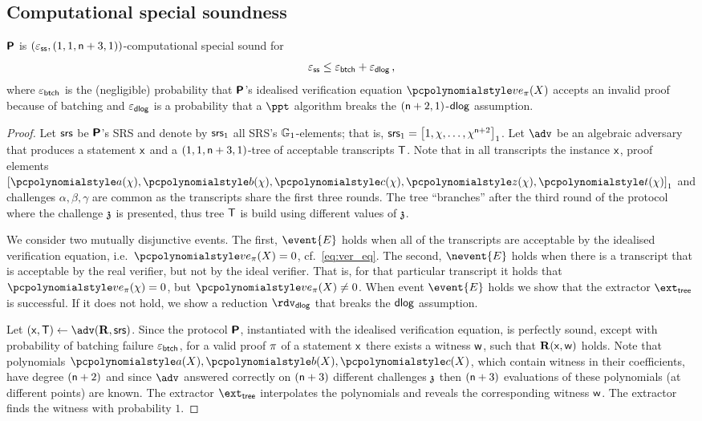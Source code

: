 \documentclass[runningheads,11pt]{llncs}
\begin{document}
\subsection{Computational special soundness}
\begin{lemma}
\label{lem:plonkprot_ss}
$\bm{\mathsf{P}}$ is $(\varepsilon_{\mathsf{ss}}, (1, 1, \mathsf{n} + 3, 1))$-computational special sound
for 
 \[
	\varepsilon_{\mathsf{ss}} \leq \varepsilon_{\mathsf{btch}} + \varepsilon_{\mathsf{dlog}}\,,
 \] 
 where $\varepsilon_{\mathsf{btch}}$ is the (negligible) probability that $\bm{\mathsf{P}}$'s idealised
 verification equation $\vereq_\zkproof(X)$ accepts an invalid proof because of batching
 and $\varepsilon_{\mathsf{dlog}}$ is a probability that a $\ppt$ algorithm breaks the
 $(\mathsf{n} + 2, 1)$-$\mathsf{dlog}$ assumption.
\end{lemma}
\begin{proof}
  Let $\mathsf{srs}$ be $\bm{\mathsf{P}}$'s SRS and denote by $\mathsf{srs}_1$ all SRS's
  $\mathbb{G}_1$-elements; that is,
  $\mathsf{srs}_1 = \left[1, \chi, \ldots, \chi^{\mathsf{n} + 2}\right]_{1}$. Let $\adv$ be an
  algebraic adversary that produces a statement $\mathsf{x}$ and a
  $(1, 1, \mathsf{n} + 3, 1)$-tree of acceptable transcripts $\mathsf{T}$.  Note that in
  all transcripts the instance $\mathsf{x}$, proof elements
  $\gone{\p{a}(\chi), \p{b}(\chi), \p{c}(\chi), \p{z}(\chi), \p{t}(\chi)}$ and
  challenges $\alpha, \beta, \gamma$ are common as the transcripts share the
  first three rounds. The tree ``branches'' after the third round of the protocol
  where the challenge $\mathfrak{z}$ is presented, thus tree $\mathsf{T}$ is build using different
  values of $\mathfrak{z}$. 

  We consider two mutually disjunctive events. The first, $\event{E}$ holds when
  all of the transcripts are acceptable by the idealised verification equation,
  i.e.~$\vereq_\zkproof(X) = 0$, cf.~\cref{eq:ver_eq}. The second, $\nevent{E}$ holds
  when there is a transcript that is acceptable by the real verifier, but not by
  the ideal verifier. That is, for that particular transcript it holds that
  $\vereq_\zkproof(\chi) = 0$, but $\vereq_\zkproof(X) \neq 0$.  When event $\event{E}$ holds we show that the extractor $\extt$ is successful. If it does not hold, we show a reduction
  $\rdvdlog$ that breaks the $\mathsf{dlog}$ assumption.

   Let $(\inp, \tree) \gets \adv(\REL,
  \srs)$. Since the protocol $\bm{\mathsf{P}}$, instantiated with the idealised
  verification equation, is perfectly sound, except with probability of batching
  failure $\varepsilon_{\mathsf{btch}}$, for a valid proof $\pi$ of a statement $\mathsf{x}$ there
  exists a witness $\mathsf{w}$, such that $\mathbf{R}(\mathsf{x}, \mathsf{w})$ holds. Note that 
  polynomials $\p{a}(X), \p{b}(X), \p{c}(X)$, which contain witness in their
  coefficients, have degree $(\mathsf{n} + 2)$ and since $\adv$ answered correctly
  on $(\mathsf{n} + 3)$ different challenges $\mathfrak{z}$ then $(\mathsf{n} + 3)$ evaluations
  of these polynomials (at different points) are known. The extractor $\extt$
  interpolates the polynomials and reveals the corresponding witness
  $\mathsf{w}$. The extractor finds the witness with probability $1$.


\end{proof}
\end{document}
